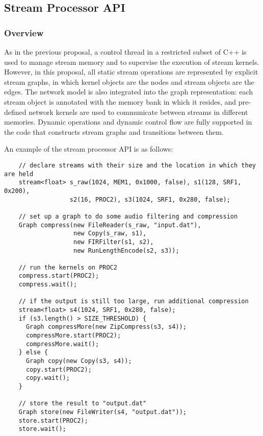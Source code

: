 \subsection{Stream Processor API}

\subsubsection{Overview}
\label{sec:streamover}

As in the previous proposal, a control thread in a restricted subset
of C++ is used to manage stream memory and to supervise the execution
of stream kernels.  However, in this proposal, all static stream
operations are represented by explicit stream graphs, in which kernel
objects are the nodes and stream objects are the edges.  The network
model is also integrated into the graph representation: each stream
object is annotated with the memory bank in which it resides, and
pre-defined network kernels are used to communicate between streams in
different memories.  Dynamic operations and dynamic control flow are
fully supported in the code that constructs stream graphs and
transitions between them.

An example of the stream processor API is as follows:
{\small
\begin{verbatim}
    // declare streams with their size and the location in which they are held
    stream<float> s_raw(1024, MEM1, 0x1000, false), s1(128, SRF1, 0x200), 
                  s2(16, PROC2), s3(1024, SRF1, 0x280, false);

    // set up a graph to do some audio filtering and compression
    Graph compress(new FileReader(s_raw, "input.dat"),
                   new Copy(s_raw, s1),
                   new FIRFilter(s1, s2),
                   new RunLengthEncode(s2, s3));

    // run the kernels on PROC2
    compress.start(PROC2);
    compress.wait();

    // if the output is still too large, run additional compression
    stream<float> s4(1024, SRF1, 0x280, false);
    if (s3.length() > SIZE_THRESHOLD) {
      Graph compressMore(new ZipCompress(s3, s4));
      compressMore.start(PROC2);
      compressMore.wait();
    } else {
      Graph copy(new Copy(s3, s4));
      copy.start(PROC2);
      copy.wait();
    }

    // store the result to "output.dat"
    Graph store(new FileWriter(s4, "output.dat"));
    store.start(PROC2);
    store.wait();
\end{verbatim}}


